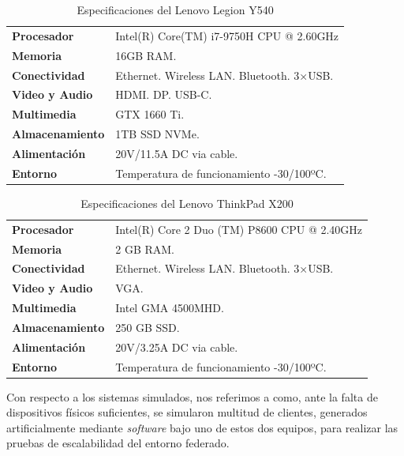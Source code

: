 \documentclass[00-Trabajo_Final.tex]{subfiles}
\begin{document}
\begin{table}[]
    \flushleft
\begin{tabular}{ll}
\hline
\textbf{Procesador}     & Intel(R) Core(TM) i7-9750H CPU @ 2.60GHz  \\
\textbf{Memoria}        & 16GB RAM.                                 \\
\textbf{Conectividad}   & Ethernet. Wireless LAN. Bluetooth. 3×USB. \\
\textbf{Video y Audio}  & HDMI. DP. USB-C.                          \\
\textbf{Multimedia}     & GTX 1660 Ti.                              \\
\textbf{Almacenamiento} & 1TB SSD NVMe.                             \\
\textbf{Alimentación}   & 20V/11.5A DC via cable.                   \\
\textbf{Entorno}        & Temperatura de funcionamiento -30/100ºC.  \\
\hline
\end{tabular}
    \caption{Especificaciones del Lenovo Legion Y540}
    \label{tab:especificaciones_lenovo}
\end{table}

\begin{table}[]
    \flushleft
\begin{tabular}{ll}
\hline
\textbf{Procesador}     & Intel(R) Core 2 Duo (TM) P8600 CPU @ 2.40GHz  \\
\textbf{Memoria}        & 2 GB RAM.                                 \\
\textbf{Conectividad}   & Ethernet. Wireless LAN. Bluetooth. 3×USB. \\
\textbf{Video y Audio}  & VGA.                          \\
\textbf{Multimedia}     & Intel GMA 4500MHD.                              \\
\textbf{Almacenamiento} & 250 GB SSD.                             \\
\textbf{Alimentación}   & 20V/3.25A DC via cable.                   \\
\textbf{Entorno}        & Temperatura de funcionamiento -30/100ºC.  \\
\hline
\end{tabular}
    \caption{Especificaciones del Lenovo ThinkPad X200}
    \label{tab:especificaciones_x200}
\end{table}

Con respecto a los sistemas simulados, nos referimos a como, ante la falta de dispositivos físicos suficientes, se simularon multitud de clientes, generados artificialmente mediante \textit{software} bajo uno de estos dos equipos, para realizar las pruebas de escalabilidad del entorno federado.
\end{document}
